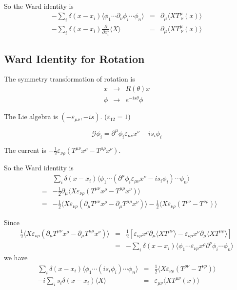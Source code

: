\documentclass[12pt]{book}
\begin{document}
	So the Ward identity is 
	\begin{eqnarray}
		-\sum_i\delta(x-x_i)\langle\phi_1\cdots\partial_\nu\phi_i\cdots\phi_n\rangle&=&\partial_\mu\langle XT^\mu_{\ \nu}(x)\rangle\\
		-\sum_i\delta(x-x_i)\frac{\partial}{\partial x_i^{\nu}} \langle X\rangle&=&\partial_\mu\langle XT^\mu_{\ \nu}(x)\rangle
	\end{eqnarray}
	
	
	\subsection{Ward Identity for Rotation}
	
	The symmetry transformation of rotation is
	\begin{eqnarray}
		x&\rightarrow &R(\theta)x\\
		\phi&\rightarrow& e^{-is\theta}\phi		
	\end{eqnarray}
	
	The Lie algebra is $(-\varepsilon_{\mu\nu},-is)$. ($\varepsilon_{12}=1$)
	
	\begin{equation}
		\mathcal G\phi_i=\partial^\mu\phi_i \varepsilon_{\mu\nu}x^\nu-is_i\phi_i
	\end{equation}
	
	The current is $-\frac 12\varepsilon_{\nu\rho}(T^{\mu\nu}x^\rho-T^{\mu\rho}x^\nu)$.
	
	So the Ward identity is 
	\begin{eqnarray}
		&&\sum_i\delta(x-x_i)\langle\phi_1\cdots(\partial^\mu\phi_i \varepsilon_{\mu\nu}x^\nu-is_i\phi_i)\cdots\phi_n\rangle\\
		&=&-\frac 12\partial_\mu\langle X\varepsilon_{\nu\rho}(T^{\mu\nu}x^\rho-T^{\mu\rho}x^\nu)\rangle\\
		&=&-\frac 12\langle X\varepsilon_{\nu\rho}(\partial_\mu T^{\mu\nu}x^\rho-\partial_\mu T^{\mu\rho}x^\nu)\rangle-\frac 12\langle X\varepsilon_{\nu\rho}(T^{\rho\nu}-T^{\nu\rho})\rangle
	\end{eqnarray}
	
	Since
	\begin{eqnarray}
		\frac 12\langle X\varepsilon_{\nu\rho}(\partial_\mu T^{\mu\nu}x^\rho-\partial_\mu T^{\mu\rho}x^\nu)\rangle &=&\frac 12[\varepsilon_{\nu\rho}x^\rho\partial_\mu\langle X T^{\mu\nu}\rangle-\varepsilon_{\nu\rho}x^\nu\partial_\mu\langle X T^{\mu\rho}\rangle]\\
		&=& -\sum_i\delta(x-x_i)\langle\phi_1\cdots\varepsilon_{\nu\rho}x^\rho\partial^\nu\phi_i\cdots\phi_n\rangle
	\end{eqnarray}
	we have
	\begin{eqnarray}
		\sum_i\delta(x-x_i)\langle\phi_1\cdots(is_i\phi_i)\cdots\phi_n\rangle &=&\frac 12\langle X\varepsilon_{\nu\rho}(T^{\rho\nu}-T^{\nu\rho})\rangle\\
		-i\sum_is_i\delta(x-x_i)\langle X\rangle &=&\varepsilon_{\mu\nu}\langle XT^{\mu\nu}(x)\rangle
	\end{eqnarray}
	
\end{document}
